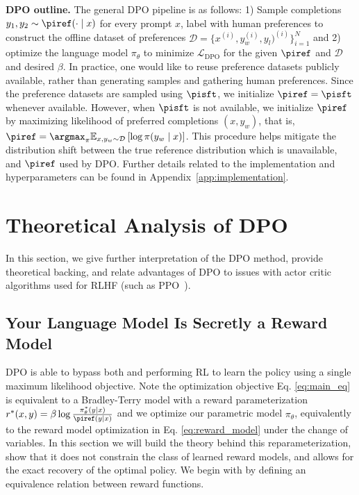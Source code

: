 \textbf{DPO outline.} 
The general DPO pipeline is as follows: 1) Sample completions $y_1, y_2 \sim \piref(\cdot \mid x)$ for every prompt $x$, label with human preferences to construct the offline dataset of preferences $\mathcal{D} = \{x^{(i)}, y_w^{(i)}, y_l)^{(i)}\}_{i=1}^N$ and 2) optimize the language model $\pi_\theta$ to minimize $\mathcal{L}_\text{DPO}$ for the given $\piref$ and $\mathcal{D}$ and desired $\beta$. 
In practice, one would like to reuse preference datasets publicly available, rather than generating samples and gathering human preferences. Since the preference datasets are sampled using $\pisft$, we initialize $\piref = \pisft$ whenever available. However, when $\pisft$ is not available, we initialize $\piref$ by maximizing likelihood of preferred completions ${(x, y_w)}$, that is, ${\piref = \argmax_{\pi}\mathbb{E}_{x, y_w \sim \mathcal{D}}\left[\log \pi(y_w \mid x)\right]}$. This procedure helps mitigate the distribution shift between the true reference distribution which is unavailable, and $\piref$ used by DPO. Further details related to the implementation and hyperparameters can be found in Appendix~\ref{app:implementation}.

\section{Theoretical Analysis of DPO}
In this section, we give further interpretation of the DPO method, provide theoretical backing, and relate advantages of DPO to issues with actor critic algorithms used for RLHF (such as PPO~\cite{schulman2017proximal}).

\label{sec:theory}

\subsection{Your Language Model Is Secretly a Reward Model} DPO is able to bypass both  and performing RL to learn the policy using a single maximum likelihood objective. Note the optimization objective Eq. \ref{eq:main_eq} is equivalent to a Bradley-Terry model with a reward parameterization $r^*(x, y) = \beta \log\frac{\pi^*_\theta(y \mid x)}{\piref(y \mid x)}$ and we optimize our parametric model $\pi_{\theta}$, equivalently to the reward model optimization in Eq. \ref{eq:reward_model} under the change of variables. In this section we will build the theory behind this reparameterization, show that it does not constrain the class of learned reward models, and allows for the exact recovery of the optimal policy. We begin with by defining an equivalence relation between reward functions. 

